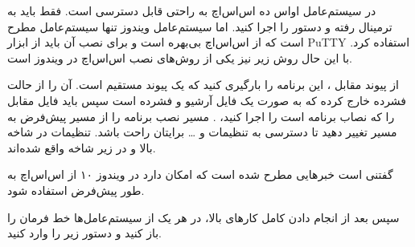 در سیستم‌عامل او‌اس ده اس‌اس‌اچ به راحتی قابل دسترسی است. فقط باید به ترمینال رفته و دستور را اجرا کنید. اما سیستم‌عامل ویندوز تنها سیستم‌عامل مطرح است که از اس‌اس‌اچ بی‌بهره است و برای نصب آن باید از ابزار PuTTY استفاده کرد. با این حال روش زیر نیز یکی از روش‌های نصب اس‌اس‌اچ در ویندوز است.

از پیوند مقابل  
، این برنامه را بارگیری کنید که یک پیوند مستقیم است.
آن را از حالت فشرده خارج کرده که به صورت یک فایل آرشیو و فشرده است سپس باید فایل مقابل را که نصاب برنامه است را اجرا کنید، 
.
مسیر نصب برنامه را از مسیر پیش‌فرض به مسیر  
  تغییر دهید تا دسترسی به تنظیمات و … برایتان راحت باشد.
تنظیمات در شاخه بالا و در زیر شاخه 
 واقع شده‌اند.

گفتنی است خبرهایی مطرح شده است که امکان دارد در ویندوز ۱۰ از اس‌اس‌اچ به طور پیش‌فرض استفاده شود.

سپس بعد از انجام دادن کامل کارهای بالا، در هر یک از سیستم‌عامل‌ها خط فرمان را باز کنید و دستور زیر را وارد کنید.

\begin{latin}
    
\end{latin}

